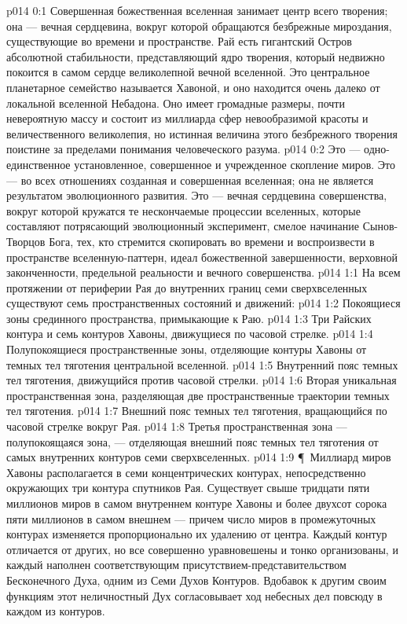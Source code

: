 \author{Совершенствователь Мудрости}
\vs p014 0:1 Совершенная божественная вселенная занимает центр всего творения; она --- вечная сердцевина, вокруг которой обращаются безбрежные мироздания, существующие во времени и пространстве. Рай есть гигантский Остров абсолютной стабильности, представляющий ядро творения, который недвижно покоится в самом сердце великолепной вечной вселенной. Это центральное планетарное семейство называется Хавоной, и оно находится очень далеко от локальной вселенной Небадона. Оно имеет громадные размеры, почти невероятную массу и состоит из миллиарда сфер невообразимой красоты и величественного великолепия, но истинная величина этого безбрежного творения поистине за пределами понимания человеческого разума.
\vs p014 0:2 Это --- одно\hyp{}единственное установленное, совершенное и учрежденное скопление миров. Это --- во всех отношениях созданная и совершенная вселенная; она не является результатом эволюционного развития. Это --- вечная сердцевина совершенства, вокруг которой кружатся те нескончаемые процессии вселенных, которые составляют потрясающий эволюционный эксперимент, смелое начинание Сынов\hyp{}Творцов Бога, тех, кто стремится скопировать во времени и воспроизвести в пространстве вселенную\hyp{}паттерн, идеал божественной завершенности, верховной законченности, предельной реальности и вечного совершенства.
\vs p014 1:1 На всем протяжении от периферии Рая до внутренних границ семи сверхвселенных существуют семь пространственных состояний и движений:
\vs p014 1:2 \bibnobreakspace Покоящиеся зоны срединного пространства, примыкающие к Раю.
\vs p014 1:3 \bibnobreakspace Три Райских контура и семь контуров Хавоны, движущиеся по часовой стрелке.
\vs p014 1:4 \bibnobreakspace Полупокоящиеся пространственные зоны, отделяющие контуры Хавоны от темных тел тяготения центральной вселенной.
\vs p014 1:5 \bibnobreakspace Внутренний пояс темных тел тяготения, движущийся против часовой стрелки.
\vs p014 1:6 \bibnobreakspace Вторая уникальная пространственная зона, разделяющая две пространственные траектории темных тел тяготения.
\vs p014 1:7 \bibnobreakspace Внешний пояс темных тел тяготения, вращающийся по часовой стрелке вокруг Рая.
\vs p014 1:8 \bibnobreakspace Третья пространственная зона --- полупокоящаяся зона, --- отделяющая внешний пояс темных тел тяготения от самых внутренних контуров семи сверхвселенных.
\vs p014 1:9 \P\ Миллиард миров Хавоны располагается в семи концентрических контурах, непосредственно окружающих три контура спутников Рая. Существует свыше тридцати пяти миллионов миров в самом внутреннем контуре Хавоны и более двухсот сорока пяти миллионов в самом внешнем --- причем число миров в промежуточных контурах изменяется пропорционально их удалению от центра. Каждый контур отличается от других, но все совершенно уравновешены и тонко организованы, и каждый наполнен соответствующим присутствием\hyp{}представительством Бесконечного Духа, одним из Семи Духов Контуров. Вдобавок к другим своим функциям этот неличностный Дух согласовывает ход небесных дел повсюду в каждом из контуров.
